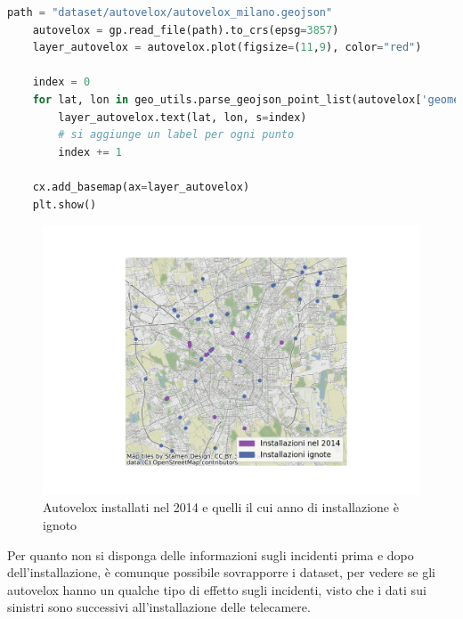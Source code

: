 \documentclass[a4paper,12pt]{report}
\begin{document}
\begin{lstlisting}[language=Python]
    path = "dataset/autovelox/autovelox_milano.geojson"
    autovelox = gp.read_file(path).to_crs(epsg=3857)
    layer_autovelox = autovelox.plot(figsize=(11,9), color="red")
    
    index = 0
    for lat, lon in geo_utils.parse_geojson_point_list(autovelox['geometry'].astype(str)):
        layer_autovelox.text(lat, lon, s=index)
        # si aggiunge un label per ogni punto
        index += 1
    
    cx.add_basemap(ax=layer_autovelox)
    plt.show()
\end{lstlisting}

\begin{figure}
    \includegraphics[width=\linewidth]{../src/autovelox/autovelox_2014.png}
    \caption{Autovelox installati nel 2014 e quelli il cui anno di installazione è ignoto}
    \label{fig:autovelox-indici}
\end{figure}

Per quanto non si disponga delle informazioni sugli incidenti prima e dopo dell'installazione, 
è comunque possibile sovrapporre i dataset, per vedere se gli autovelox hanno un qualche tipo di 
effetto sugli incidenti, visto che i dati sui sinistri sono successivi all'installazione 
delle telecamere.
\end{document}
